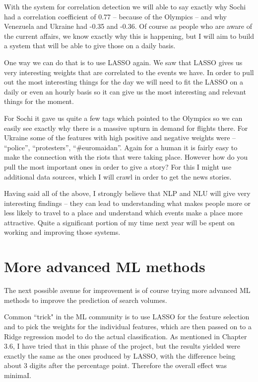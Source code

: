 \documentclass[minf,twoside,singlespacing,parskip,frontabs,notimes,11pt]{infthesis}
\begin{document}
With the system for correlation detection we will able to say exactly why Sochi had a correlation coefficient of 0.77 -- because of the Olympics -- and why Venezuela and Ukraine had -0.35 and -0.36. Of course as people who are aware of the current affairs, we know exactly why this is happening, but I will aim to build a system that will be able to give those on a daily basis. 


One way we can do that is to use LASSO again. We saw that LASSO gives us very interesting weights that are correlated to the events we have. In order to pull out the most interesting things for the day we will need to fit the LASSO on a daily or even an hourly basis so it can give us the most interesting and relevant things for the moment. 


For Sochi it gave us quite a few tags which pointed to the Olympics so we can easily see exactly why there is a massive upturn in demand for flights there. For Ukraine some of the features with high positive and negative weights were -- ``police'', ``protesters'', ``\#euromaidan''. Again for a human it is fairly easy to make the connection with the riots that were taking place. However how do you pull the most important ones in order to give a story? For this I might use additional data sources, which I will crawl in order to get the news stories. 


Having said all of the above, I strongly believe that NLP and NLU will give very interesting findings -- they can lead to understanding what makes people more or less likely to travel to a place and understand which events make a place more attractive. Quite a significant portion of my time next year will be spent on working and improving those systems. 


\section{More advanced ML methods}


The next possible avenue for improvement is of course trying more advanced ML methods to improve the prediction of search volumes. 

Common ``trick" in the ML community is to use LASSO for the feature selection and to pick the weights for the individual features, which are then passed on to a Ridge regression model to do the actual classification. As mentioned in Chapter 3.6, I have tried that in this phase of the project, but the results yielded were exactly the same as the ones produced by LASSO, with the difference being about 3 digits after the percentage point. Therefore the overall effect was minimaI. 
\end{document}
